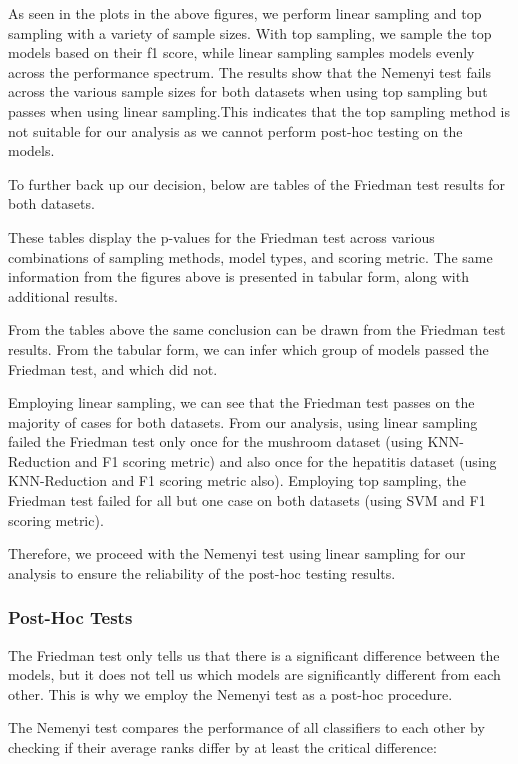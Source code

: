 As seen in the plots in the above figures, we perform linear sampling and top sampling with a variety
of sample sizes. With top sampling, we sample the top models based on their f1 score, while linear sampling samples models
evenly across the performance spectrum. The results show that the Nemenyi test fails across the various sample sizes for both datasets
when using top sampling but passes when using linear sampling.This indicates that the top sampling method is not suitable for our analysis
as we cannot perform post-hoc testing on the models.

To further back up our decision, below are tables of the Friedman test results for both datasets.




These tables display the p-values for the Friedman test across various combinations
of sampling methods, model types, and scoring metric. The same information from the figures 
above is presented in tabular form, along with additional results.

From the tables above the same conclusion can be drawn from the Friedman test results.
From the tabular form, we can infer which group of models passed the Friedman test, and which did not.

Employing linear sampling, we can see that the Friedman test passes on the majority
of cases for both datasets. From our analysis, using linear sampling failed the Friedman test
only once for the mushroom dataset (using KNN-Reduction and F1 scoring metric) and also once
for the hepatitis dataset (using KNN-Reduction and F1 scoring metric also). Employing top sampling,
the Friedman test failed for all but one case on both datasets (using SVM and F1 scoring metric).

Therefore, we proceed with the Nemenyi test using linear sampling for our analysis to
ensure the reliability of the post-hoc testing results.

\subsubsection{Post-Hoc Tests}
The Friedman test only tells us that there is a significant difference between the models,
but it does not tell us which models are significantly different from each other.
This is why we employ the Nemenyi test as a post-hoc procedure.

The Nemenyi test compares the performance of all classifiers to each
other by checking if their average ranks differ by at least the critical difference:

